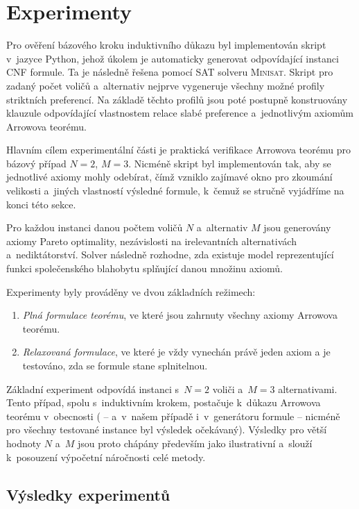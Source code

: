 \documentclass[a4paper, 11pt]{article}
\begin{document}
\section{Experimenty}\label{sec:Experiments}


Pro ověření bázového kroku induktivního důkazu byl implementován skript v~jazyce Python, jehož úkolem je automaticky generovat odpovídající instanci CNF formule.
Ta je následně řešena pomocí SAT solveru \textsc{Minisat}.
Skript pro zadaný počet voličů a~alternativ nejprve vygeneruje všechny možné profily striktních preferencí.
Na základě těchto profilů jsou poté postupně konstruovány klauzule odpovídající vlastnostem relace slabé preference a~jednotlivým axiomům Arrowova teorému.

Hlavním cílem experimentální části je praktická verifikace Arrowova teorému pro bázový případ $N=2$, $M=3$.
Nicméně skript byl implementován tak, aby se jednotlivé axiomy mohly odebírat, čímž vzniklo zajímavé okno pro zkoumání velikosti a~jiných vlastností výsledné formule, k~čemuž se stručně vyjádříme na konci této sekce.

Pro každou instanci danou počtem voličů $N$ a~alternativ $M$ jsou generovány axiomy Pareto optimality, nezávislosti na irelevantních alternativách a~nediktátorství.
Solver následně rozhodne, zda existuje model reprezentující funkci společenského blahobytu splňující danou množinu axiomů.

Experimenty byly prováděny ve dvou základních režimech:
\begin{enumerate}
    \item \emph{Plná formulace teorému}, ve které jsou zahrnuty všechny axiomy Arrowova teorému.
    \item \emph{Relaxovaná formulace}, ve které je vždy vynechán právě jeden axiom a je testováno, zda se formule stane splnitelnou.
\end{enumerate}

Základní experiment odpovídá instanci s~$N=2$ voliči a~$M=3$ alternativami.
Tento případ, spolu s~induktivním krokem, postačuje k~důkazu Arrowova teorému v~obecnosti ( -- a~v~našem případě i~v~generátoru formule -- nicméně pro všechny testované instance byl výsledek očekávaný).
Výsledky pro větší hodnoty $N$ a~$M$ jsou proto chápány především jako ilustrativní a~slouží k~posouzení výpočetní náročnosti celé metody.

\subsection{Výsledky experimentů}
\end{document}
